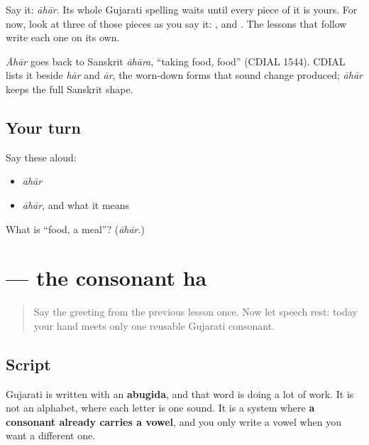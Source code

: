 Say it: \emph{āhār}. Its whole Gujarati spelling waits until every piece of it is yours. For now, look at three of those pieces as you say it: \textbf{}, \textbf{} and \textbf{}. The lessons that follow write each one on its own.

\begin{cousinweb}
\emph{Āhār} goes back to Sanskrit \emph{āhāra}, \textquotedblleft{}taking food, food\textquotedblright{} (CDIAL 1544). CDIAL lists it beside \emph{hār} and \emph{ār}, the worn-down forms that sound change produced; \emph{āhār} keeps the full Sanskrit shape.
\end{cousinweb}

\subsection*{Your turn}
Say these aloud:

\begin{itemize}
\raggedright
  \item \emph{āhār}
  \item \emph{āhār}, and what it means
\end{itemize}

\begin{tcolorbox}[breakable,colback=teal!4,colframe=teal!35!black,title={Before you move on}]
What is \textquotedblleft{}food, a meal\textquotedblright{}? (\emph{āhār}.)
\end{tcolorbox}
\section[\texorpdfstring{\gu{હ} (ha)}{હ (ha)}]{ — the consonant ha}

\label{lesson:GU-W01-ha}



\begin{quote}
Say the greeting from the previous lesson once. Now let speech rest: today your hand meets only one reusable Gujarati consonant.
\end{quote}

\subsection*{Script}
Gujarati is written with an \textbf{abugida}, and that word is doing a lot of work. It is not an alphabet, where each letter is one sound. It is a system where \textbf{a consonant already carries a vowel}, and you only write a vowel when you want a different one.

